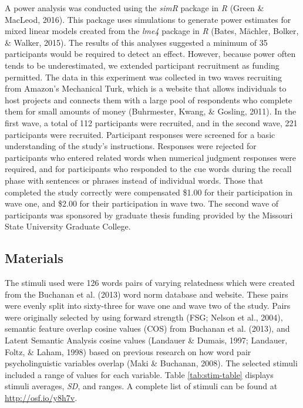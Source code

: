 \documentclass[english,,man]{apa6}
\begin{document}
A power analysis was conducted using the \emph{simR} package in \emph{R} (Green \& MacLeod, 2016). This package uses simulations to generate power estimates for mixed linear models created from the \emph{lme4} package in \emph{R} (Bates, Mächler, Bolker, \& Walker, 2015). The results of this analyses suggested a minimum of 35 participants would be required to detect an effect. However, because power often tends to be underestimated, we extended participant recruitment as funding permitted. The data in this experiment was collected in two waves recruiting from Amazon's Mechanical Turk, which is a website that allows individuals to host projects and connects them with a large pool of respondents who complete them for small amounts of money (Buhrmester, Kwang, \& Gosling, 2011). In the first wave, a total of 112 participants were recruited, and in the second wave, 221 participants were recruited. Participant responses were screened for a basic understanding of the study's instructions. Responses were rejected for participants who entered related words when numerical judgment responses were required, and for participants who responded to the cue words during the recall phase with sentences or phrases instead of individual words. Those that completed the study correctly were compensated \$1.00 for their participation in wave one, and \$2.00 for their participation in wave two. The second wave of participants was sponsored by graduate thesis funding provided by the Missouri State University Graduate College.

\hypertarget{materials}{%
\subsection{Materials}\label{materials}}

The stimuli used were 126 words pairs of varying relatedness which were created from the Buchanan et al. (2013) word norm database and website. These pairs were evenly split into sixty-three for wave one and wave two of the study. Pairs were originally selected by using forward strength (FSG; Nelson et al., 2004), semantic feature overlap cosine values (COS) from Buchanan et al. (2013), and Latent Semantic Analysis cosine values (Landauer \& Dumais, 1997; Landauer, Foltz, \& Laham, 1998) based on previous research on how word pair psycholinguistic variables overlap (Maki \& Buchanan, 2008). The selected stimuli included a range of values for each variable. Table \ref{tab:stim-table} displays stimuli averages, \emph{SD}, and ranges. A complete list of stimuli can be found at \url{http://osf.io/y8h7v}.
\end{document}
